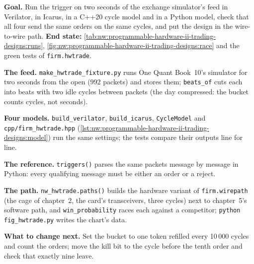 \begin{tutorial}
\textbf{Goal.} Run the trigger on two seconds of the exchange simulator's feed in Verilator, in Icarus, in a C++20 cycle model and in a
Python model, check that all four send the same orders on the same cycles, and put the design in the wire-to-wire path.
\textbf{End state:} \cref{tab:nw:programmable-hardware-ii-trading-designs:runs}, \cref{fig:nw:programmable-hardware-ii-trading-designs:race}
and the green tests of \texttt{firm.hwtrade}.
\begin{tutsteps}
\item \textbf{The feed.} \texttt{make\_hwtrade\_fixture.py} runs One Quant Book~10's simulator for two seconds from the open (992 packets)
  and stores them; \texttt{beats\_of} cuts each into beats with two idle cycles between packets (the day compressed: the bucket counts
  cycles, not seconds).
\item \textbf{Four models.} \texttt{build\_verilator}, \texttt{build\_icarus}, \texttt{CycleModel} and \texttt{cpp/firm\_hwtrade.hpp}
  (\cref{lst:nw:programmable-hardware-ii-trading-designs:model}) run the same settings; the tests compare their outputs line for line.
\item \textbf{The reference.} \texttt{triggers()} parses the same packets message by message in Python: every qualifying message must be
  either an order or a reject.
\item \textbf{The path.} \texttt{nw\_hwtrade.paths()} builds the hardware variant of \texttt{firm.wirepath} (the cage of chapter~2, the
  card's transceivers, three cycles) next to chapter~5's software path, and \texttt{win\_probability} races each against a competitor;
  \texttt{python fig\_hwtrade.py} writes the chart's data.
\end{tutsteps}
\textbf{What to change next.} Set the bucket to one token refilled every 10\,000 cycles and count the orders; move the kill bit to the
cycle before the tenth order and check that exactly nine leave.
\end{tutorial}

\label{lst:nw:programmable-hardware-ii-trading-designs:model}

